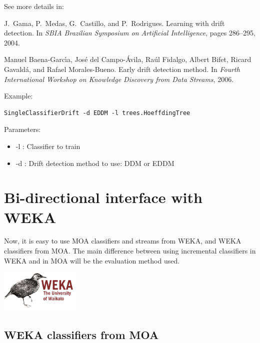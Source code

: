 \documentclass[a4paper,12pt,twoside]{book}
\begin{document}
See more details in:

\begin{itemize}
J.~Gama, P.~Medas, G.~Castillo, and P.~Rodrigues.
\newblock Learning with drift detection.
\newblock In {\em SBIA Brazilian Symposium on Artificial Intelligence}, pages
  286--295, 2004.

Manuel Baena-Garc\'{\i}a, Jos{\'e} del Campo-{\'A}vila, Ra\'ul Fidalgo, Albert
  Bifet, Ricard Gavald\'a, and Rafael Morales-Bueno.
\newblock Early drift detection method.
\newblock In {\em Fourth International Workshop on Knowledge Discovery from
  Data Streams}, 2006.\end{itemize}

Example:
\begin{footnotesize}\begin{verbatim}
SingleClassifierDrift -d EDDM -l trees.HoeffdingTree
\end{verbatim}\end{footnotesize}

Parameters:
\begin{itemize}
\item -l : Classifier to train
\item -d : Drift detection method to use: DDM or EDDM
\end{itemize}



\chapter{Bi-directional interface with WEKA}
\label{chap:Weka}

Now, it is easy to use MOA classifiers and streams from WEKA, and WEKA classifiers from MOA.
The main difference between using incremental classifiers in WEKA and in MOA will be the evaluation method used.

\begin{center}
\includegraphics[height=2cm]{figures/Weka.png}\end{center}

\section{WEKA classifiers from MOA}
\end{document}
